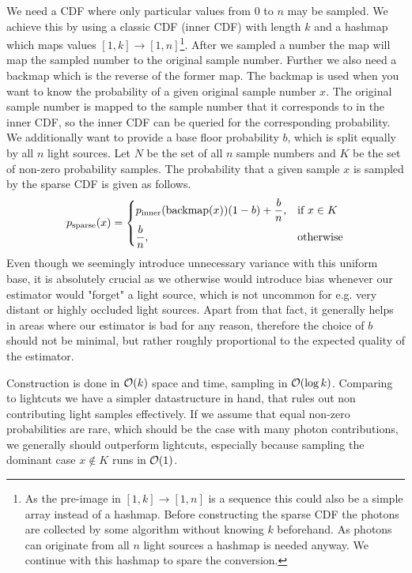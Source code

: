 We need  a CDF where only particular values from $0$ to $n$ may be sampled. We achieve this by using a classic CDF (inner CDF) with length $k$ and a hashmap which maps values $[1,k]\to [1,n]$\footnote{As the pre-image in $[1,k]\to [1,n]$ is a sequence this could also be a simple array instead of a hashmap. Before constructing the sparse CDF the photons are collected by some algorithm without knowing $k$ beforehand. As photons can originate from all $n$ light sources a hashmap is needed anyway. We continue with this hashmap to spare the conversion.}. After we sampled a number the map will map the sampled number to the original sample number. Further we also need a backmap which is the reverse of the former map. The backmap is used when you want to know the probability of a given original sample number $x$. The original sample number is mapped to the sample number that it corresponds to in the inner CDF, so the inner CDF can be queried for the corresponding probability. We additionally want to provide a base floor probability $b$, which is split equally by all $n$ light sources. Let $N$ be the set of all $n$ sample numbers and $K$ be the set of non-zero probability samples. The probability that a given sample $x$ is sampled by the sparse CDF is given as follows.
\begin{align}\label{eq:psparse}
 p_{\text{sparse}}(x) = 
\begin{dcases}
    p_{\text{inner}}(\text{backmap}(x))(1 - b) + \frac{b}{n},& \text{if } x \in K\\
    \frac{b}{n}, & \text{otherwise}
\end{dcases}
\end{align}
Even though we seemingly introduce unnecessary variance with this uniform base, it is absolutely crucial as we otherwise would introduce bias whenever our estimator would "forget" a light source, which is not uncommon for e.g. very distant or highly occluded light sources. Apart from that fact, it generally helps in areas where our estimator is bad for any reason, therefore the choice of $b$ should not be minimal, but rather roughly proportional to the expected quality of the estimator.

Construction is done in $\mathcal{O}(k)$ space and time, sampling in $\mathcal{O}(\log{k})$. Comparing to lightcuts we have a simpler datastructure in hand, that rules out non contributing light samples effectively. If we assume that equal non-zero probabilities are rare, which should be the case with many photon contributions, we generally should outperform lightcuts, especially because sampling the dominant case $x \notin K$ runs in $\mathcal{O}(1)$. 

